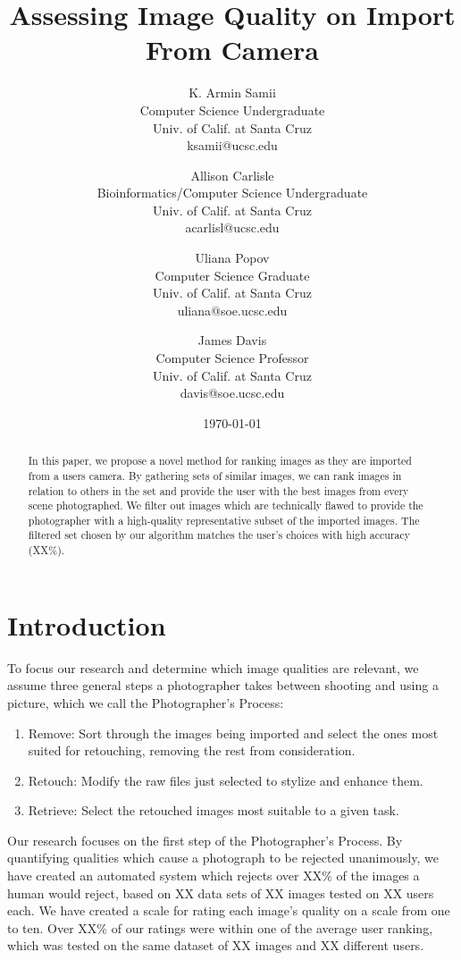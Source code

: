 \documentclass[twocolumn]{article}
\title{
Assessing Image Quality on Import From Camera
} %
\author{
K. Armin Samii\\
Computer Science Undergraduate\\
Univ. of Calif. at Santa Cruz\\
ksamii@ucsc.edu
\and
Allison Carlisle\\
Bioinformatics/Computer Science Undergraduate\\
Univ. of Calif. at Santa Cruz\\
acarlisl@ucsc.edu
\and
Uliana Popov\\
Computer Science Graduate\\
Univ. of Calif. at Santa Cruz\\
uliana@soe.ucsc.edu
\and
James Davis\\
Computer Science Professor\\
Univ. of Calif. at Santa Cruz\\
davis@soe.ucsc.edu
}
\date{\today}
\begin{document}
\maketitle
\begin{abstract}
In this paper, we propose a novel method for ranking images as they are imported from a users camera. By gathering sets of similar images, we can rank images in relation to others in the set and provide the user with the best images from every scene photographed. We filter out images which are technically flawed to provide the photographer with a high-quality representative subset of the imported images. The filtered set chosen by our algorithm matches the user's choices with high accuracy (XX\%).
\end{abstract}

\section{Introduction}
To focus our research and determine which image qualities are relevant, we assume three general steps a photographer takes between shooting and using a picture, which we call the Photographer's Process:
\begin{enumerate}
\item Remove: Sort through the images being imported and select the ones most suited for retouching, removing the rest from consideration.
\item Retouch: Modify the raw files just selected to stylize and enhance them.
\item Retrieve: Select the retouched images most suitable to a given task.
\end{enumerate}
Our research focuses on the first step of the Photographer's Process. By quantifying qualities which cause a photograph to be rejected unanimously, we have created an automated system which rejects over XX\% of the images a human would reject, based on XX data sets of XX images tested on XX users each. We have created a scale for rating each image's quality on a scale from one to ten. Over XX\% of our ratings were within one of the average user ranking, which was tested on the same dataset of XX images and XX different users.
\end{document}
